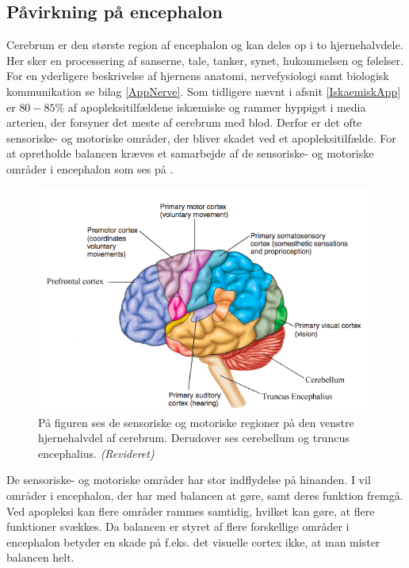 \subsection{Påvirkning på encephalon}\label{HjerneSenMot}
Cerebrum er den største region af encephalon og kan deles op i to hjernehalvdele. Her sker en processering af sanserne, tale, tanker, synet, hukommelsen og følelser. \cite{Martini2012} For en yderligere beskrivelse af hjernens anatomi, nervefysiologi samt biologisk kommunikation se bilag \ref{AppNerve}. Som tidligere nævnt i afsnit \ref{IskaemiskApp} er $80-85\%$ af apopleksitilfældene iskæmiske og rammer hyppigst i media arterien, der forsyner det meste af cerebrum med blod. Derfor er det ofte sensoriske- og motoriske områder, der bliver skadet ved et apopleksitilfælde. \cite{Kruuse2015a,Gade2004,Boss2010} For at opretholde balancen kræves et samarbejde af de sensoriske- og motoriske områder i encephalon som ses på .

\begin{figure}[H]
	\centering
	\includegraphics[scale=0.6]{figures/bProblemanalyse/Encephalon3.png}
	\caption{På figuren ses de sensoriske og motoriske regioner på den venstre hjernehalvdel af cerebrum. Derudover ses cerebellum og truncus encephalius. \textit{(Revideret)} \cite{Stanfield2014}}
	\label{Enc}
\end{figure}

De sensoriske- og motoriske områder har stor indflydelse på hinanden. I  vil områder i encephalon, der har med balancen at gøre, samt deres funktion fremgå. Ved apopleksi kan flere områder rammes samtidig, hvilket kan gøre, at flere funktioner svækkes. Da balancen er styret af flere forskellige områder i encephalon betyder en skade på f.eks. det visuelle cortex ikke, at man mister balancen helt. 

